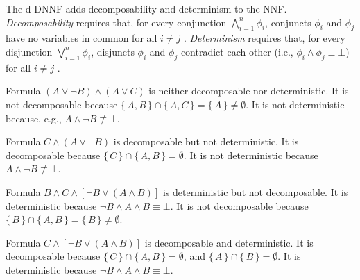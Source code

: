 \begin{definition}
  The d-DNNF adds decomposability and determinism to the NNF\@.
  \emph{Decomposability} requires that, for every conjunction
  $\bigwedge_{i=1}^n \phi_i$, conjuncts $\phi_i$ and $\phi_j$ have no variables
  in common for all $i \ne j$
  \citep{DBLP:conf/ijcai/Darwiche99,DBLP:journals/jacm/Darwiche01}.
  \emph{Determinism} requires that, for every disjunction
  $\bigvee_{i=1}^n \phi_i$, disjuncts $\phi_i$ and $\phi_j$ contradict each
  other (i.e., $\phi_i \land \phi_j \equiv \bot$) for all $i \ne j$
  \citep{DBLP:journals/jancl/Darwiche01}.
\end{definition}

\begin{example}
  Formula $(A \lor \neg B) \land (A \lor C)$ is neither decomposable nor
  deterministic. It is not decomposable because
  $\{\, A, B \,\} \cap \{\, A, C \,\} = \{\, A \,\} \ne \emptyset$. It is not
  deterministic because, e.g., $A \land \neg B \not\equiv \bot$.
\end{example}

\begin{example}\label{example:ddnnf1}
  Formula $C \land (A \lor \neg B)$ is decomposable but not deterministic. It is
  decomposable because $\{\, C \,\} \cap \{\, A, B \,\} = \emptyset$. It is not
  deterministic because $A \land \neg B \not\equiv \bot$.
\end{example}

\begin{example}
  Formula $B \land C \land [\neg B \lor (A \land B)]$ is deterministic but not
  decomposable. It is deterministic because
  $\neg B \land A \land B \equiv \bot$. It is not decomposable because
  $\{\, B \,\} \cap \{\, A, B \,\} = \{\, B \,\} \ne \emptyset$.
\end{example}

\begin{example}\label{example:ddnnf2}
  Formula $C \land [\neg B \lor (A \land B)]$ is decomposable and deterministic.
  It is decomposable because $\{\, C \,\} \cap \{\, A, B \,\} = \emptyset$, and
  $\{\, A \,\} \cap \{\, B \,\} = \emptyset$. It is deterministic because
  $\neg B \land A \land B \equiv \bot$.
\end{example}

